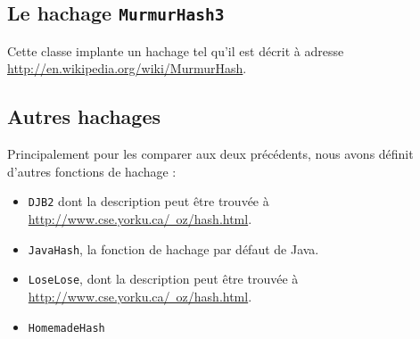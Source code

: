 \documentclass[12pt,a4paper,titlepage]{article}
\newcommand{\class}[1]{\texttt{#1}}
\begin{document}
\subsection{Le hachage \class{MurmurHash3}}
Cette classe implante un hachage tel qu'il est décrit à adresse \href{http://en.wikipedia.org/wiki/MurmurHash}{http://en.wikipedia.org/wiki/MurmurHash}.

\subsection{Autres hachages}
Principalement pour les comparer aux deux précédents, nous avons définit d'autres fonctions de hachage :
\begin{itemize}
\item \class{DJB2} dont la description peut être trouvée à \href{http://www.cse.yorku.ca/~oz/hash.html}{http://www.cse.yorku.ca/~oz/hash.html}.
\item \class{JavaHash}, la fonction de hachage par défaut de Java.
\item \class{LoseLose}, dont la description peut être trouvée à \href{http://www.cse.yorku.ca/~oz/hash.html}{http://www.cse.yorku.ca/~oz/hash.html}.
\item \class{HomemadeHash} %
\end{itemize}
\end{document}
